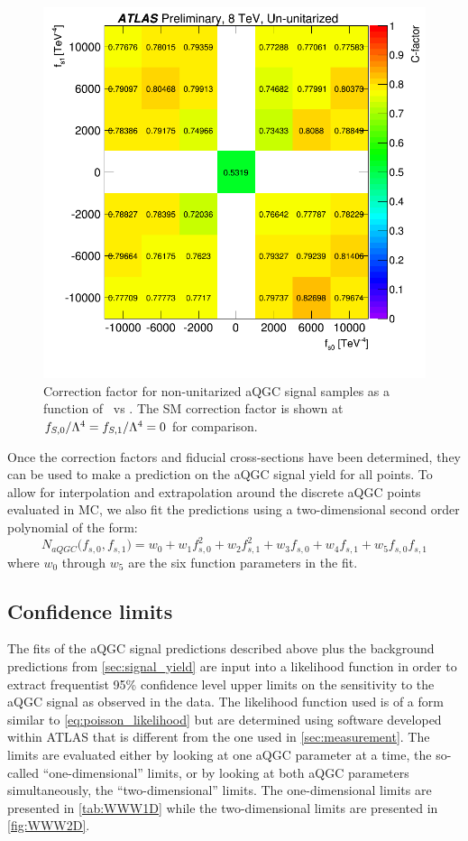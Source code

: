 \begin{figure}[ht!]
\centering
\includegraphics[width=.8\textwidth]{figures/aQGC/cfactor_chargesum.png}
\caption{Correction factor for non-unitarized aQGC signal samples as a function of \fszero~vs \fsone.
The SM correction factor is shown at $f_{S,0}/\Lambda^4=f_{S,1}/\Lambda^4=0$ for comparison.}
\label{fig:aqgc_cfactor_3l}
\end{figure}


Once the correction factors and fiducial cross-sections have been determined,
they can be used to make a prediction on the aQGC signal yield 
for all points.  To allow for interpolation and extrapolation
around the discrete aQGC points evaluated in MC, we also 
fit the predictions using a two-dimensional second order polynomial of 
the form:
\begin{equation}
N_{aQGC}\big(f_{s,0},f_{s,1}\big) = w_0 + w_1 f_{s,0}^2 + w_2 f_{s,1}^2
+ w_3 f_{s,0} + w_4  f_{s,1} + w_5 f_{s,0} f_{s,1}
\end{equation}
where $w_0$ through $w_5$ are the six function parameters in the fit.




\subsection{Confidence limits}

The fits of the aQGC signal predictions described above plus the background predictions
from \sec\ref{sec:signal_yield} are input into a likelihood function
in order to extract frequentist 95\% confidence level upper limits on the 
sensitivity to the aQGC signal as observed in the data.
The likelihood function used is of a form similar to \eqn\eqref{eq:poisson_likelihood}
but are determined using software developed within ATLAS \cite{tgclim} that is different
from the one used in \sec\ref{sec:measurement}.
The limits are evaluated either by looking at one aQGC 
parameter at a time, the so-called ``one-dimensional''
limits, or by looking at both aQGC parameters simultaneously, the 
``two-dimensional'' limits. The one-dimensional limits
are presented in \tab\ref{tab:WWW1D}
while the two-dimensional limits are presented in 
\fig\ref{fig:WWW2D}.
  
